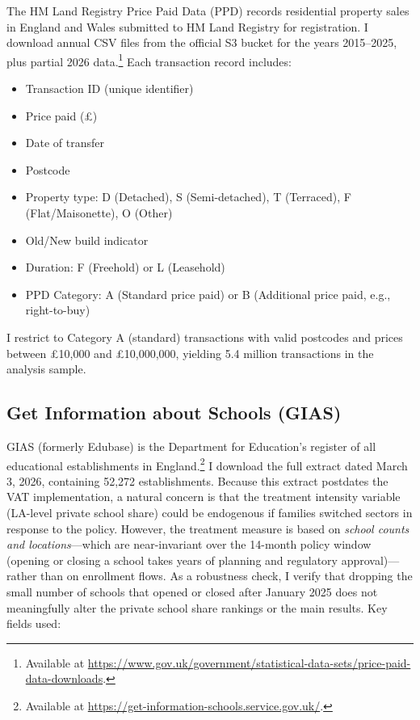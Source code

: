 \documentclass[12pt]{article}
\begin{document}
The HM Land Registry Price Paid Data (PPD) records residential property sales in England and Wales submitted to HM Land Registry for registration. I download annual CSV files from the official S3 bucket for the years 2015--2025, plus partial 2026 data.\footnote{Available at \url{https://www.gov.uk/government/statistical-data-sets/price-paid-data-downloads}.} Each transaction record includes:

\begin{itemize}
    \item Transaction ID (unique identifier)
    \item Price paid (\pounds)
    \item Date of transfer
    \item Postcode
    \item Property type: D (Detached), S (Semi-detached), T (Terraced), F (Flat/Maisonette), O (Other)
    \item Old/New build indicator
    \item Duration: F (Freehold) or L (Leasehold)
    \item PPD Category: A (Standard price paid) or B (Additional price paid, e.g., right-to-buy)
\end{itemize}

I restrict to Category A (standard) transactions with valid postcodes and prices between \pounds 10,000 and \pounds 10,000,000, yielding 5.4 million transactions in the analysis sample.

\subsection{Get Information about Schools (GIAS)}

GIAS (formerly Edubase) is the Department for Education's register of all educational establishments in England.\footnote{Available at \url{https://get-information-schools.service.gov.uk/}.} I download the full extract dated March 3, 2026, containing 52,272 establishments. Because this extract postdates the VAT implementation, a natural concern is that the treatment intensity variable (LA-level private school share) could be endogenous if families switched sectors in response to the policy. However, the treatment measure is based on \textit{school counts and locations}---which are near-invariant over the 14-month policy window (opening or closing a school takes years of planning and regulatory approval)---rather than on enrollment flows. As a robustness check, I verify that dropping the small number of schools that opened or closed after January 2025 does not meaningfully alter the private school share rankings or the main results. Key fields used:
\end{document}
